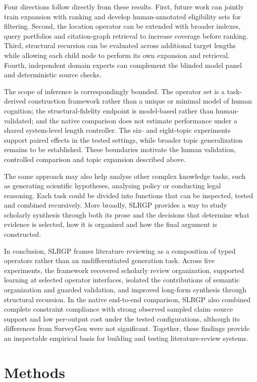 \documentclass[11pt,a4paper]{article}
\begin{document}
Four directions follow directly from these results. First, future work can jointly train expansion with ranking and develop human-annotated eligibility sets for filtering. Second, the location operator can be extended with broader indexes, query portfolios and citation-graph retrieval to increase coverage before ranking. Third, structural recursion can be evaluated across additional target lengths while allowing each child node to perform its own expansion and retrieval. Fourth, independent domain experts can complement the blinded model panel and deterministic source checks.

The scope of inference is correspondingly bounded. The operator set is a task-derived construction framework rather than a unique or minimal model of human cognition; the structural-fidelity endpoint is model-based rather than human-validated; and the native comparison does not estimate performance under a shared system-level length controller. The six- and eight-topic experiments support paired effects in the tested settings, while broader topic generalization remains to be established. These boundaries motivate the human validation, controlled comparison and topic expansion described above.

The same approach may also help analyse other complex knowledge tasks, such as generating scientific hypotheses, analysing policy or conducting legal reasoning. Each task could be divided into functions that can be inspected, tested and combined recursively. More broadly, SLRGP provides a way to study scholarly synthesis through both its prose and the decisions that determine what evidence is selected, how it is organized and how the final argument is constructed.

In conclusion, SLRGP frames literature reviewing as a composition of typed operators rather than an undifferentiated generation task. Across five experiments, the framework recovered scholarly review organization, supported learning at selected operator interfaces, isolated the contributions of semantic organization and guarded validation, and improved long-form synthesis through structural recursion. In the native end-to-end comparison, SLRGP also combined complete constraint compliance with strong observed sampled claim--source support and low per-output cost under the tested configurations, although its differences from SurveyGen were not significant. Together, these findings provide an inspectable empirical basis for building and testing literature-review systems.

\section*{Methods}
\end{document}
